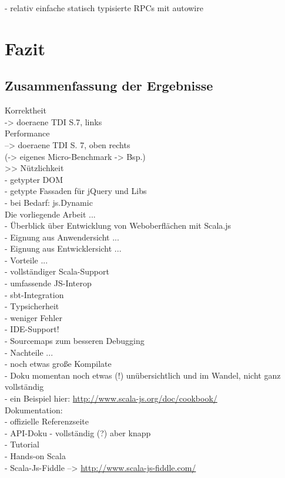 \documentclass[a4paper, 12pt, hidelinks, listof=totoc, listoftables=totoc, bibliography=totoc]{scrreprt}
\begin{document}
- relativ einfache statisch typisierte RPCs mit autowire




\chapter{Fazit}\label{chap:conclusion}

\section{Zusammenfassung der Ergebnisse}

   Korrektheit \\
	-> doeraene TDI S.7, links \\
   Performance \\
	--> doeraene TDI S. 7, oben rechts \\
	(-> eigenes Micro-Benchmark -> Bsp.) \\
>> Nützlichkeit \\
	- getypter DOM \\
	- getypte Fassaden für jQuery und Libs \\
	- bei Bedarf: js.Dynamic \\

Die vorliegende Arbeit ... \\
- Überblick über Entwicklung von Weboberflächen mit Scala.js \\
- Eignung aus Anwendersicht ... \\
- Eignung aus Entwicklersicht ... \\
- Vorteile ... \\
	- vollständiger Scala-Support \\
	- umfassende JS-Interop \\
	- sbt-Integration \\
	- Typsicherheit \\
		- weniger Fehler \\
		- IDE-Support! \\
	- Sourcemaps zum besseren Debugging \\
- Nachteile ... \\
	- noch etwas große Kompilate \\
	- Doku momentan noch etwas (!) unübersichtlich und im Wandel, nicht ganz vollständig \\
		- ein Beispiel hier: \url{http://www.scala-js.org/doc/cookbook/} \\
		Dokumentation: \\
		- offizielle Referenzseite \\
		- API-Doku - vollständig (?) aber knapp \\
		- Tutorial \\
		- Hands-on Scala \\
		- Scala-Js-Fiddle  -->  \url{http://www.scala-js-fiddle.com/} \\
\end{document}
